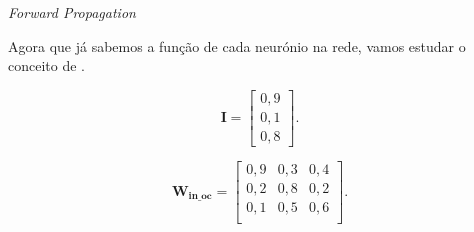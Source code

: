 \begin{frame}{\textit{Forward Propagation}}
	
	Agora que já sabemos a função de cada neurónio na rede, vamos estudar o conceito de .
	    
	\begin{figure}
		\centering
		
	\end{figure}
	    
	\begin{multicols}{2}
		\centering    
		\begin{equation*}
			\mathbf{I} = \begin{bmatrix}
			0,9\\ 
			0,1\\ 
			0,8
			\end{bmatrix}.
		\end{equation*}    	
		        
		\begin{equation*}
			\mathbf{W_{\text{in\_oc}}} = \begin{bmatrix}
			0,9 & 0,3 & 0,4 \\ 
			0,2 & 0,8 & 0,2 \\
			0,1 & 0,5 & 0,6 \\
			\end{bmatrix}.
		\end{equation*}    	
	\end{multicols}
	
\end{frame}

